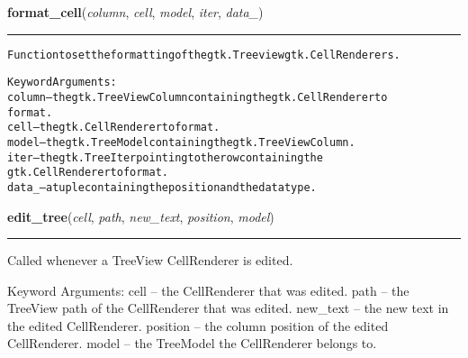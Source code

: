     \label{reliafree:widgets:format_cell}

    \vspace{0.5ex}

\hspace{.8\funcindent}\begin{boxedminipage}{\funcwidth}

    \raggedright \textbf{format\_cell}(\textit{column}, \textit{cell}, \textit{model}, \textit{iter}, \textit{data\_})

    \vspace{-1.5ex}

    \rule{\textwidth}{0.5\fboxrule}
\setlength{\parskip}{2ex}
\begin{alltt}
Function to set the formatting of the gtk.Treeview gtk.CellRenderers.

Keyword Arguments:
column -- the gtk.TreeViewColumn containing the gtk.CellRenderer to
          format.
cell   -- the gtk.CellRenderer to format.
model  -- the gtk.TreeModel containing the gtk.TreeViewColumn.
iter   -- the gtk.TreeIter pointing to the row containing the
          gtk.CellRenderer to format.
data\_  -- a tuple containing the position and the data type.
\end{alltt}

\setlength{\parskip}{1ex}
    \end{boxedminipage}

    \label{reliafree:widgets:edit_tree}

    \vspace{0.5ex}

\hspace{.8\funcindent}\begin{boxedminipage}{\funcwidth}

    \raggedright \textbf{edit\_tree}(\textit{cell}, \textit{path}, \textit{new\_text}, \textit{position}, \textit{model})

    \vspace{-1.5ex}

    \rule{\textwidth}{0.5\fboxrule}
\setlength{\parskip}{2ex}
    Called whenever a TreeView CellRenderer is edited.

    Keyword Arguments: cell     -- the CellRenderer that was edited. path
    -- the TreeView path of the CellRenderer that was edited. new\_text -- 
    the new text in the edited CellRenderer. position -- the column 
    position of the edited CellRenderer. model    -- the TreeModel the 
    CellRenderer belongs to.

\setlength{\parskip}{1ex}
    \end{boxedminipage}

